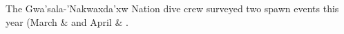 The Gwa'sala-'Nakwaxda'xw Nation dive crew surveyed two spawn events this year
(March  \&  and April  & .